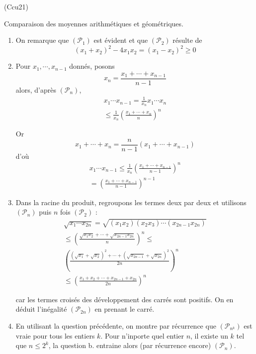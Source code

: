 \begin{tiny}(Ccu21)\end{tiny} Comparaison des moyennes arithmétiques et géométriques.
\begin{enumerate}
  \item On remarque que $(\mathcal{P}_{1})$ est évident et que $(\mathcal{P}_{2})$ résulte de
\begin{displaymath}
  (x_1+x_2)^2-4x_1x_2=(x_1-x_2)^2\geq 0
\end{displaymath}
 \item Pour $x_1,\cdots, x_{n-1}$ donnés, posons
\begin{displaymath}
x_n = \frac{x_1+\cdots +x_{n-1}}{n-1}  
\end{displaymath}
alors, d'après $(\mathcal{P}_n)$,
\begin{multline*}
x_1\cdots x_{n-1}=\frac{1}{x_n}x_1\cdots x_n \\
\leq \frac{1}{x_n} \left(\frac{x_1+\cdots+x_{n}}{n} \right)^n 
\end{multline*}

Or
\begin{displaymath}
x_1+\cdots +x_n =\frac{n}{n-1}(x_1+\cdots+x_{n-1})
\end{displaymath}
d'où
\begin{multline*}
x_1\cdots x_{n-1}\leq \frac{1}{x_n} \left(\frac{x_1+\cdots+x_{n-1}}{n-1} \right)^n \\
= \left(\frac{x_1+\cdots+x_{n-1}}{n-1} \right)^{n-1}
\end{multline*}

\item Dans la racine du produit, regroupons les termes deux par deux et utilisons $(\mathcal{P}_n)$ puis $n$ fois $(\mathcal{P}_2)$ :
\begin{multline*}
\sqrt{x_1\cdots x_{2n}} = \sqrt{(x_1 x_2)(x_2 x_3)\cdots (x_{2n-1}x_{2n})} \\
\leq \left(\frac{\sqrt{x_1x_2}+\cdots+\sqrt{x_{2n-1}x_{2n}}}{n} \right)^n \leq \\ \left(\frac{(\sqrt{x_1}+\sqrt{x_2})^2+\cdots+(\sqrt{x_{2n-1}}+\sqrt{x_{2n}})^2}{2n} \right)^n \\
\leq \left( \frac{x_1+x_2 + \cdots +x_{2n-1} +x_{2n}}{2n}\right)^n 
\end{multline*}

car les termes croisés des développement des carrés sont positifs. On en déduit l'inégalité $(\mathcal{P}_{2n})$ en prenant le carré.

\item En utilisant la question précédente, on montre par récurrence que $(\mathcal{P}_{n^k})$ est vraie pour tous les entiers $k$. Pour n'inporte quel entier $n$, il existe un $k$ tel que $n\leq 2^k$, la question b. entraine alors (par récurrence encore) $(\mathcal{P}_n)$.
\end{enumerate}
